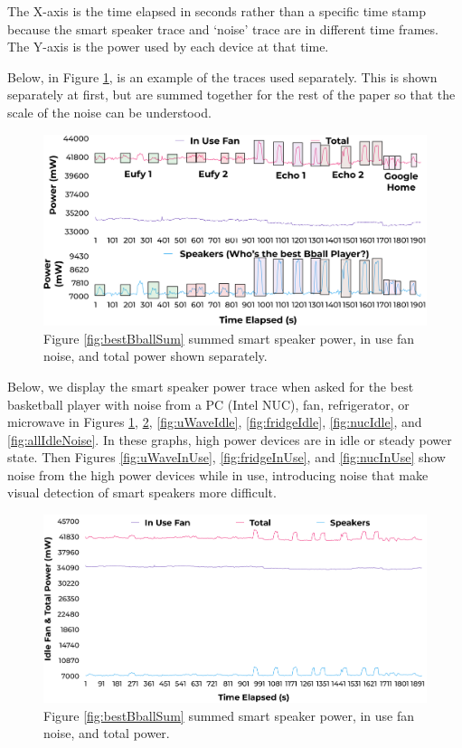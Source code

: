 The X-axis is the time elapsed in seconds rather than a specific time stamp because the smart speaker trace and `noise' trace are in different time frames. The Y-axis is the power used by each device at that time.

Below, in Figure \ref{fig:fanIdleSeperate}, is an example of the traces used separately. This is shown separately at first, but are summed together for the rest of the paper so that the scale of the noise can be understood.

\begin{figure}[H]
  \centering
  \includegraphics[width=1\textwidth]{figures/inUseFanNoiseSeperate.png}
  \caption{Figure \ref{fig:bestBballSum} summed smart speaker power, in use fan noise, and total power shown separately.}
  \label{fig:fanIdleSeperate}
\end{figure}

Below, we display the smart speaker power trace when asked for the best basketball player with noise from a PC (Intel NUC), fan, refrigerator, or microwave in Figures \ref{fig:fanIdleSeperate}, \ref{fig:fanIdle}, \ref{fig:uWaveIdle}, \ref{fig:fridgeIdle}, \ref{fig:nucIdle}, and \ref{fig:allIdleNoise}. In these graphs, high power devices are in idle or steady power state. Then Figures \ref{fig:uWaveInUse}, \ref{fig:fridgeInUse}, and \ref{fig:nucInUse} show noise from the high power devices while in use, introducing noise that make visual detection of smart speakers more difficult.

\begin{figure}[H]
  \centering
  \includegraphics[width=1\textwidth]{figures/inUseFanNoise.png}
  \caption{Figure \ref{fig:bestBballSum} summed smart speaker power, in use fan noise, and total power.}
  \label{fig:fanIdle}
\end{figure}

